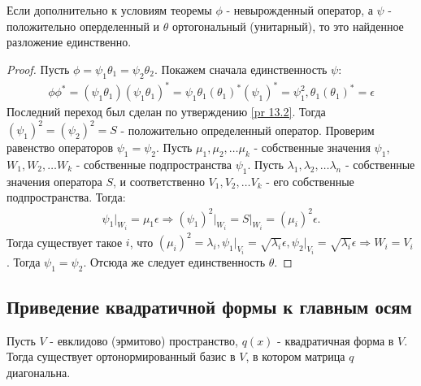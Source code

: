 \begin{corollary}
    Если дополнительно к условиям теоремы $\phi$ - невырожденный оператор, а $\psi$ - положительно оперделенный и $\theta$ ортогональный (унитарный), то это найденное разложение единственно.
\end{corollary}

\begin{proof}
    Пусть $\phi = \psi_1 \theta_1 = \psi_2 \theta_2$.
    Покажем сначала единственность $\psi$:
    \begin{gather*}
        \phi \phi^* = (\psi_1 \theta_1) (\psi_1 \theta_1)^* = \psi_1 \theta_1 (\theta_1)^* (\psi_1)^* = \psi_1^2, \theta_1 (\theta_1)^* = \epsilon
    \end{gather*}
    Последний переход был сделан по утверждению \ref{pr 13.2}. Тогда $(\psi_1)^2 = (\psi_2)^2 = S$ - положительно определенный оператор. Проверим равенство операторов $\psi_1 = \psi_2$. Пусть $\mu_1, \mu_2, \dots \mu_k$ - собственные значения $\psi_1$, 
    $W_1, W_2, \dots W_k$ - собственные подпространства $\psi_1$. Пусть $\lambda_1, \lambda_2, \dots \lambda_n$ - 
    собственные значения оператора $S$, и соответственно $V_1, V_2, \dots V_k$ - его собственные подпространства.
    Тогда:
    \begin{gather*}
        \psi_1 \vert_{W_i} = \mu_1 \epsilon \Rightarrow (\psi_1)^2 \vert_{W_i} = S \vert_{W_i} = (\mu_i)^2 \epsilon.
    \end{gather*}
    Тогда существует такое $i$, что $(\mu_i)^2 = \lambda_i, \psi_1 \vert_{V_i} = \sqrt{\lambda_i} \epsilon, \psi_2 \vert_{V_i} = \sqrt{\lambda_i} \epsilon  \Rightarrow W_i = V_i$. Тогда $\psi_1 = \psi_2$. Отсюда же следует единственность $\theta$.
\end{proof}

\subsection{Приведение квадратичной формы к главным осям}

\begin{theorem}
    \label{th 13.5}
    Пусть $V$ - евклидово (эрмитово) пространство, $q(x)$ - квадратичная форма в $V$. Тогда существует ортонормированный базис в $V$, в котором матрица $q$ диагональна.
\end{theorem}

